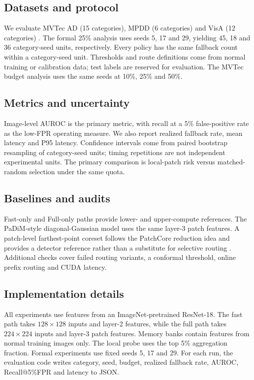 \documentclass[iicol,pdflatex,sn-basic,Numbered]{sn-jnl}
\begin{document}
\subsection{Datasets and protocol}
We evaluate MVTec AD (15 categories), MPDD (6 categories) and VisA (12 categories) \cite{bergmann2019mvtec,jezek2021mpdd,zou2022visa}. The formal 25\% analysis uses seeds 5, 17 and 29, yielding 45, 18 and 36 category-seed units, respectively. Every policy has the same fallback count within a category-seed unit. Thresholds and route definitions come from normal training or calibration data; test labels are reserved for evaluation. The MVTec budget analysis uses the same seeds at 10\%, 25\% and 50\%.

\subsection{Metrics and uncertainty}
Image-level AUROC is the primary metric, with recall at a 5\% false-positive rate as the low-FPR operating measure. We also report realized fallback rate, mean latency and P95 latency. Confidence intervals come from paired bootstrap resampling of category-seed units; timing repetitions are not independent experimental units. The primary comparison is local-patch risk versus matched-random selection under the same quota.

\subsection{Baselines and audits}
Fast-only and Full-only paths provide lower- and upper-compute references. The PaDiM-style diagonal-Gaussian model uses the same layer-3 patch features. A patch-level farthest-point coreset follows the PatchCore reduction idea and provides a detector reference rather than a substitute for selective routing \cite{roth2022patchcore}. Additional checks cover failed routing variants, a conformal threshold, online prefix routing and CUDA latency.

\subsection{Implementation details}
All experiments use features from an ImageNet-pretrained ResNet-18. The fast path takes $128\times128$ inputs and layer-2 features, while the full path takes $224\times224$ inputs and layer-3 patch features. Memory banks contain features from normal training images only. The local probe uses the top 5\% aggregation fraction. Formal experiments use fixed seeds 5, 17 and 29. For each run, the evaluation code writes category, seed, budget, realized fallback rate, AUROC, Recall@5\%FPR and latency to JSON.
\end{document}
